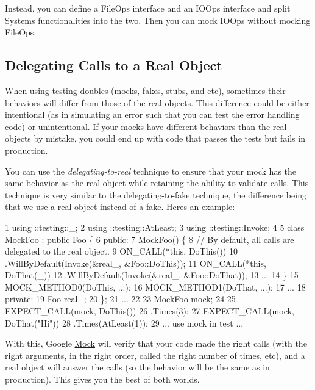 Instead, you can define a {\ttfamily File\+Ops} interface and an {\ttfamily I\+O\+Ops} interface and split {\ttfamily System}\textquotesingle{}s functionalities into the two. Then you can mock {\ttfamily I\+O\+Ops} without mocking {\ttfamily File\+Ops}.

\subsection*{Delegating Calls to a Real Object}

When using testing doubles (mocks, fakes, stubs, and etc), sometimes their behaviors will differ from those of the real objects. This difference could be either intentional (as in simulating an error such that you can test the error handling code) or unintentional. If your mocks have different behaviors than the real objects by mistake, you could end up with code that passes the tests but fails in production.

You can use the {\itshape delegating-\/to-\/real} technique to ensure that your mock has the same behavior as the real object while retaining the ability to validate calls. This technique is very similar to the delegating-\/to-\/fake technique, the difference being that we use a real object instead of a fake. Here\textquotesingle{}s an example\+:


\begin{DoxyCode}
1 using ::testing::\_;
2 using ::testing::AtLeast;
3 using ::testing::Invoke;
4 
5 class MockFoo : public Foo \{
6  public:
7   MockFoo() \{
8     // By default, all calls are delegated to the real object.
9     ON\_CALL(*this, DoThis())
10         .WillByDefault(Invoke(&real\_, &Foo::DoThis));
11     ON\_CALL(*this, DoThat(\_))
12         .WillByDefault(Invoke(&real\_, &Foo::DoThat));
13     ...
14   \}
15   MOCK\_METHOD0(DoThis, ...);
16   MOCK\_METHOD1(DoThat, ...);
17   ...
18  private:
19   Foo real\_;
20 \};
21 ...
22 
23   MockFoo mock;
24 
25   EXPECT\_CALL(mock, DoThis())
26       .Times(3);
27   EXPECT\_CALL(mock, DoThat("Hi"))
28       .Times(AtLeast(1));
29   ... use mock in test ...
\end{DoxyCode}


With this, Google \hyperlink{class_mock}{Mock} will verify that your code made the right calls (with the right arguments, in the right order, called the right number of times, etc), and a real object will answer the calls (so the behavior will be the same as in production). This gives you the best of both worlds.

